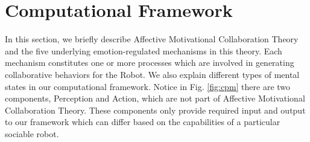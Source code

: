 
\section{Computational Framework}
\label{sec:computational-framework}

In this section, we briefly describe Affective Motivational Collaboration
Theory \cite{shayganfar:theory-overview} and the five underlying
emotion-regulated mechanisms in this theory. Each mechanism constitutes one or
more processes which are involved in generating collaborative behaviors for the
Robot. We also explain different types of mental states in our computational
framework. Notice in Fig. \ref{fig:cpm} there are two components, Perception and
Action, which are not part of Affective Motivational Collaboration Theory. These
components only provide required input and output to our framework which can
differ based on the capabilities of a particular sociable robot.

